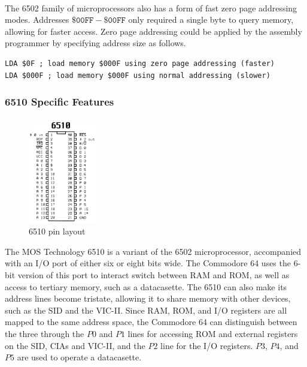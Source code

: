 \documentclass{article}
\begin{document}
\paragraph{}
The 6502 family of microprocessors also has a form of fast zero page addressing modes. Addresses $\mathtt{\$00FF - \$00FF}$ only required a single byte to query memory, allowing for faster access. Zero page addressing could be applied by the assembly programmer by specifying address size as follows.
\begin{lstlisting}
LDA $0F ; load memory $000F using zero page addressing (faster)
LDA $000F ; load memory $000F using normal addressing (slower)
\end{lstlisting}

\pagebreak

\subsubsection{6510 Specific Features}
\paragraph{}
\begin{figure}
\vspace{-20pt}
\begin{center}
\includegraphics[width=3cm]{6510}
\caption{6510 pin layout}
\end{center}
\end{figure}
The MOS Technology 6510 is a variant of the 6502 microprocessor, accompanied with an I/O port of either six or eight bits wide. The Commodore 64 uses the 6-bit version of this port to interact switch between RAM and ROM, as well as access to tertiary memory, such as a datacasette. The 6510 can also make its address lines become tristate, allowing it to share memory with other devices, such as the SID and the VIC-II. Since RAM, ROM, and I/O registers are all mapped to the same address space, the Commodore 64 can distinguish between the three through the $P0$ and $P1$ lines for accessing ROM and external registers on the SID, CIAs and VIC-II, and the $P2$ line for the I/O registers. $P3$, $P4$, and $P5$ are used to operate a datacasette.
\end{document}
